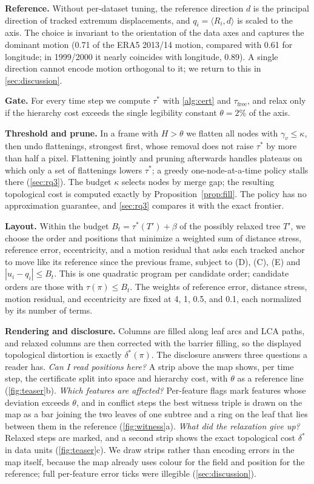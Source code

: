 \documentclass[review]{vgtc}                 %
\newcommand{\free}{\mathrm{free}}
\begin{document}
\textbf{Reference.} Without per-dataset tuning, the reference direction $d$ is the principal direction of tracked extremum displacements, and $q_i=\langle R_i,d\rangle$ is scaled to the axis. The choice is invariant to the orientation of the data axes and captures the dominant motion (0.71 of the ERA5 2013/14 motion, compared with 0.61 for longitude; in 1999/2000 it nearly coincides with longitude, 0.89). A single direction cannot encode motion orthogonal to it; we return to this in \cref{sec:discussion}.

\textbf{Gate.} For every time step we compute $\tau^*$ with \cref{alg:cert} and $\tau_\free$, and relax only if the hierarchy cost exceeds the single legibility constant $\theta=2\%$ of the axis.

\textbf{Threshold and prune.} In a frame with $H>\theta$ we flatten all nodes with $\gamma_v\le\kappa$, then undo flattenings, strongest first, whose removal does not raise $\tau^*$ by more than half a pixel. Flattening jointly and pruning afterwards handles plateaus on which only a set of flattenings lowers $\tau^*$; a greedy one-node-at-a-time policy stalls there (\cref{sec:rq3}). The budget $\kappa$ selects nodes by merge gap; the resulting topological cost is computed exactly by Proposition~\ref{prop:fill}. The policy has no approximation guarantee, and \cref{sec:rq3} compares it with the exact frontier.

\textbf{Layout.} Within the budget $B_t=\tau^*(T')+\beta$ of the possibly relaxed tree $T'$, we choose the order and positions that minimize a weighted sum of distance stress, reference error, eccentricity, and a motion residual that asks each tracked anchor to move like its reference since the previous frame, subject to (D), (C), (E) and $|u_i-q_i|\le B_t$. This is one quadratic program per candidate order; candidate orders are those with $\tau(\pi)\le B_t$. The weights of reference error, distance stress, motion residual, and eccentricity are fixed at 4, 1, 0.5, and 0.1, each normalized by its number of terms.

\textbf{Rendering and disclosure.} Columns are filled along leaf arcs and LCA paths, and relaxed columns are then corrected with the barrier filling, so the displayed topological distortion is exactly $\delta^*(\pi)$. The disclosure answers three questions a reader has. \emph{Can I read positions here?} A strip above the map shows, per time step, the certificate split into space and hierarchy cost, with $\theta$ as a reference line (\cref{fig:teaser}b). \emph{Which features are affected?} Per-feature flags mark features whose deviation exceeds $\theta$, and in conflict steps the best witness triple is drawn on the map as a bar joining the two leaves of one subtree and a ring on the leaf that lies between them in the reference (\cref{fig:witness}a). \emph{What did the relaxation give up?} Relaxed steps are marked, and a second strip shows the exact topological cost $\delta^*$ in data units (\cref{fig:teaser}c). We draw strips rather than encoding errors in the map itself, because the map already uses colour for the field and position for the reference; full per-feature error ticks were illegible (\cref{sec:discussion}).
\end{document}
